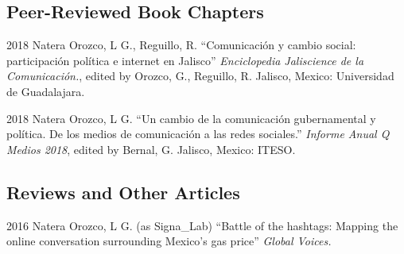 \documentclass{academiccv}
\begin{document}










\subsection*{Peer-Reviewed Book Chapters}

\begin{tablist}

\item[2018] \tab Natera Orozco, L G., Reguillo, R. \enquote{Comunicación y cambio social: participación política e internet en Jalisco} \textit{Enciclopedia Jaliscience de la Comunicación.}, edited by Orozco, G., Reguillo, R. Jalisco, Mexico: Universidad de Guadalajara.

\item[2018] \tab Natera Orozco, L G. \enquote{Un cambio de la comunicación gubernamental y política. De los medios de comunicación a las redes sociales.} \textit{Informe Anual Q Medios 2018}, edited by Bernal, G. Jalisco, Mexico: ITESO.


\end{tablist}



\subsection*{Reviews and Other Articles}

\begin{tablist}
	
\item[2016] \tab Natera Orozco, L G. (as Signa\_Lab) \enquote{Battle of the hashtags: Mapping the online conversation surrounding Mexico's gas price} \textit{Global Voices.}

	
\end{tablist}
\end{document}
